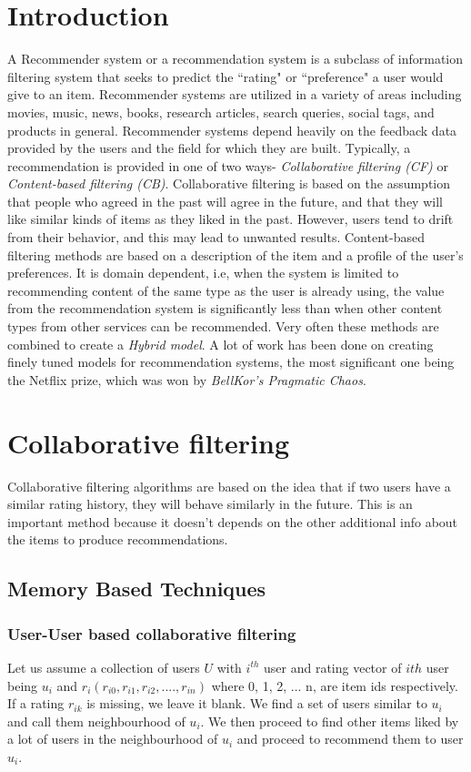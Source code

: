 \documentclass[conference]{IEEEtran}
\begin{document}
\section{Introduction}
A Recommender system or a recommendation system is a subclass of information filtering system that seeks to predict the ``rating" or ``preference" a user would give to an item. Recommender systems are utilized in a variety of areas including movies, music, news, books, research articles, search queries, social tags, and products in general.
Recommender systems depend heavily on the feedback data provided by the users and the field for which they are built.
Typically, a recommendation is provided in one of two ways- \textit{Collaborative filtering (CF)} or \textit{Content-based filtering (CB)}. Collaborative filtering is based on the assumption that people who agreed in the past will agree in the future, and that they will like similar kinds of items as they liked in the past.
However, users tend to drift from their behavior, and this may lead to unwanted results. Content-based filtering methods are based on a description of the item and a profile of the user’s preferences. It is domain dependent, i.e, when the system is limited to recommending content of the same type as the user is already using, the value from the recommendation system is significantly less than when other content types from other services can be recommended.
Very often these methods are combined to create a \textit{Hybrid model}. A lot of work has been done on creating finely tuned models for recommendation systems, the most significant one being the Netflix prize, which was won by \textit{BellKor's Pragmatic Chaos}.

\section{Collaborative filtering}
Collaborative filtering algorithms are based on the idea that if two users have a similar rating history, they will behave similarly in the future.  This is an important method because it doesn't depends on the other additional info about the items to produce recommendations.

\subsection{Memory Based Techniques}
\subsubsection{User-User based collaborative filtering}
Let us assume a collection of users \(U\) with \(i^{th}\) user and rating vector of \(ith\) user being  \(u_{i}\) and $r_{i} (r_{i0}, r_{i1}, r_{i2}, ...., r_{in})$ where 0, 1, 2, ... n, are item ids respectively. If a rating $r_{ik}$ is missing, we leave it blank. We find a set of users similar to \(u_{i}\) and call them neighbourhood of \(u_{i}\). We then proceed to find other items liked by a lot of users in the neighbourhood of \(u_{i}\) and proceed to recommend them to user \(u_{i}\).
\end{document}
